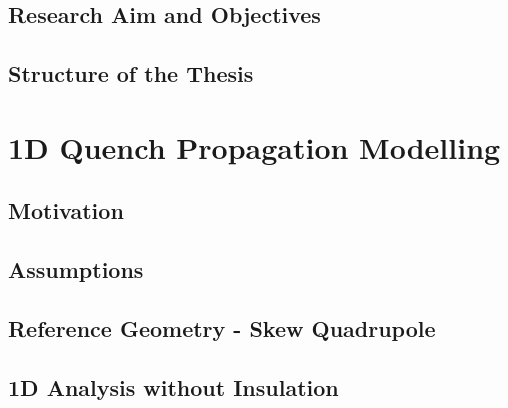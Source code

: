 \documentclass{article}
\begin{document}
\subsection{Research Aim and Objectives}


\subsection{Structure of the Thesis}


\clearpage
\section{1D Quench Propagation Modelling}
\label{section: 1d_quench_propagation_modelling}

\subsection{Motivation}
\label{subsection: 1d_quench_propagation_motivation}


\subsection{Assumptions}
\label{subsection: 1d_quench_propagation_assumptions}


\subsection{Reference Geometry - Skew Quadrupole}
\label{subsection: 1d_quench_propagation_geometry}


% 

\subsection{1D Analysis without Insulation}
\label{subsection: 1D_quench_propagation_no_insulation}

\end{document}
